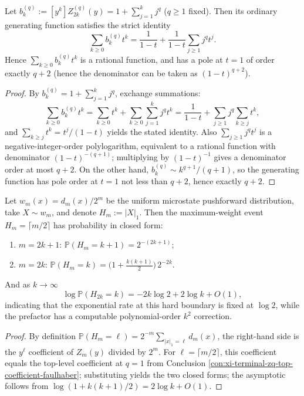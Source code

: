 \begin{conclusion}\label{con:xi-terminal-max-weight-top-sector-ogf}
Let
\(
b_k^{(q)}:=[y^{k}]Z_{2k}^{(q)}(y)=1+\sum_{j=1}^{k}j^{q}
\)
(\(q\ge 1\) fixed).
Then its ordinary generating function satisfies the strict identity
\[
\sum_{k\ge 0} b_k^{(q)}t^{k}
=\frac{1}{1-t}+\frac{1}{1-t}\sum_{j\ge 1}j^{q}t^{j}.
\]
Hence \(\sum_{k\ge 0} b_k^{(q)}t^{k}\) is a rational function, and has a pole at \(t=1\) of order exactly \(q+2\) (hence the denominator can be taken as \((1-t)^{q+2}\)).
\end{conclusion}
\begin{proof}
By \(b_k^{(q)}=1+\sum_{j=1}^k j^q\), exchange summations:
\[
\sum_{k\ge 0}b_k^{(q)}t^k=\sum_{k\ge 0}t^k+\sum_{k\ge 0}\sum_{j=1}^{k}j^q t^k
=\frac{1}{1-t}+\sum_{j\ge 1}j^q\sum_{k\ge j}t^k,
\]
and \(\sum_{k\ge j}t^k=t^j/(1-t)\) yields the stated identity.
Also \(\sum_{j\ge 1}j^q t^j\) is a negative-integer-order polylogarithm, equivalent to a rational function with denominator \((1-t)^{-(q+1)}\);
multiplying by \((1-t)^{-1}\) gives a denominator order at most \(q+2\).
On the other hand, \(b_k^{(q)}\sim k^{q+1}/(q+1)\), so the generating function has pole order at \(t=1\) not less than \(q+2\), hence exactly \(q+2\).
\end{proof}

\begin{conclusion}[Exact probability of the hard-boundary event: polynomial prefactor for \texorpdfstring{$H_m=\lceil m/2\rceil$}{H_m=ceil(m/2)}]\label{con:xi-terminal-hard-boundary-event-probability}
Let \(w_m(x)=d_m(x)/2^m\) be the uniform microstate pushforward distribution, take \(X\sim w_m\), and denote \(H_m:=|X|_1\).
Then the maximum-weight event \(H_m=\lceil m/2\rceil\) has probability in closed form:
\begin{enumerate}
  \item \(m=2k+1\): \(\mathbb{P}(H_m=k+1)=2^{-(2k+1)}\);
  \item \(m=2k\): \(\mathbb{P}(H_m=k)=\bigl(1+\tfrac{k(k+1)}{2}\bigr)\,2^{-2k}\).
\end{enumerate}
And as \(k\to\infty\)
\[
\log \mathbb{P}(H_{2k}=k)= -2k\log 2 +2\log k +O(1),
\]
indicating that the exponential rate at this hard boundary is fixed at \(\log 2\), while the prefactor has a computable polynomial-order \(k^2\) correction.
\end{conclusion}
\begin{proof}
By definition \(\mathbb{P}(H_m=\ell)=2^{-m}\sum_{|x|_1=\ell}d_m(x)\), the right-hand side is the \(y^\ell\) coefficient of \(Z_m(y)\) divided by \(2^m\).
For \(\ell=\lceil m/2\rceil\), this coefficient equals the top-level coefficient at \(q=1\) from Conclusion \ref{con:xi-terminal-zq-top-coefficient-faulhaber}; substituting yields the two closed forms; the asymptotic follows from \(\log(1+k(k+1)/2)=2\log k+O(1)\).
\end{proof}

